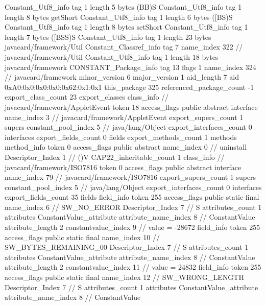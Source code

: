 {{{		}
		Constant_Utf8_info {
			tag	1
			length	5
			bytes	(BB)S
		}
		Constant_Utf8_info {
			tag	1
			length	8
			bytes	getShort
		}
		Constant_Utf8_info {
			tag	1
			length	6
			bytes	([BS)S
		}
		Constant_Utf8_info {
			tag	1
			length	8
			bytes	setShort
		}
		Constant_Utf8_info {
			tag	1
			length	7
			bytes	([BSS)S
		}
		Constant_Utf8_info {
			tag	1
			length	23
			bytes	javacard/framework/Util
		}
		Constant_Classref_info {
			tag	7
			name_index	322		// javacard/framework/Util
		}
		Constant_Utf8_info {
			tag	1
			length	18
			bytes	javacard/framework
		}
		CONSTANT_Package_info {
			tag	13
			flags	1
			name_index	324		// javacard/framework
			minor_version	6
			major_version	1
			aid_length	7
			aid	0xA0:0x0:0x0:0x0:0x62:0x1:0x1
		}
	}
	this_package	325
	referenced_package_count	-1
	export_class_count	23
	export_classes {
		class_info {		// javacard/framework/AppletEvent
			token	18
			access_flags	public abstract interface
			name_index	3		// javacard/framework/AppletEvent
			export_supers_count	1
			supers {
				constant_pool_index	5		// java/lang/Object
			}
			export_interfaces_count	0
			interfaces {
			}
			export_fields_count	0
			fields {
			}
			export_methods_count	1
			methods {
				method_info {
					token	0
					access_flags	public abstract
					name_index	0		// uninstall
					Descriptor_Index	1		// ()V
				}
			}
			CAP22_inheritable_count	1
		}
		class_info {		// javacard/framework/ISO7816
			token	0
			access_flags	public abstract interface
			name_index	79		// javacard/framework/ISO7816
			export_supers_count	1
			supers {
				constant_pool_index	5		// java/lang/Object
			}
			export_interfaces_count	0
			interfaces {
			}
			export_fields_count	35
			fields {
			field_info {
				token	255
				access_flags	public static final
				name_index	6		// SW_NO_ERROR
				Descriptor_Index	7		// S
				attributes_count	1
				attributes {
				ConstantValue_attribute {
					attribute_name_index	8		// ConstantValue
					attribute_length	2
					constantvalue_index	9		// value = -28672
				}
				}
			}
			field_info {
				token	255
				access_flags	public static final
				name_index	10		// SW_BYTES_REMAINING_00
				Descriptor_Index	7		// S
				attributes_count	1
				attributes {
				ConstantValue_attribute {
					attribute_name_index	8		// ConstantValue
					attribute_length	2
					constantvalue_index	11		// value = 24832
				}
				}
			}
			field_info {
				token	255
				access_flags	public static final
				name_index	12		// SW_WRONG_LENGTH
				Descriptor_Index	7		// S
				attributes_count	1
				attributes {
				ConstantValue_attribute {
					attribute_name_index	8		// ConstantValue
}}}}}}}
